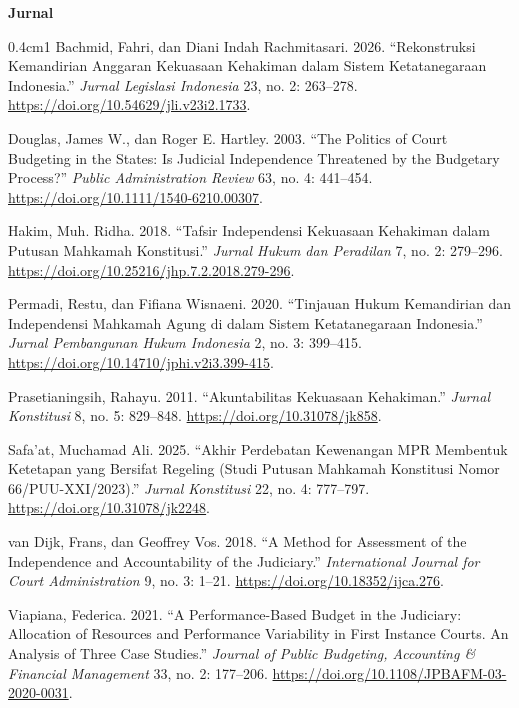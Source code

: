 \documentclass[12pt,a4paper,twocolumn]{article}
\begin{document}
\vspace{0.15em}
\noindent \textbf{Jurnal}
\begin{hangparas}{0.4cm}{1}
    Bachmid, Fahri, dan Diani Indah Rachmitasari. 2026. ``Rekonstruksi Kemandirian Anggaran Kekuasaan Kehakiman dalam Sistem Ketatanegaraan Indonesia.'' \textit{Jurnal Legislasi Indonesia} 23, no. 2: 263--278. \url{https://doi.org/10.54629/jli.v23i2.1733}.

    Douglas, James W., dan Roger E. Hartley. 2003. ``The Politics of Court Budgeting in the States: Is Judicial Independence Threatened by the Budgetary Process?'' \textit{Public Administration Review} 63, no. 4: 441--454. \url{https://doi.org/10.1111/1540-6210.00307}.

    Hakim, Muh. Ridha. 2018. ``Tafsir Independensi Kekuasaan Kehakiman dalam Putusan Mahkamah Konstitusi.'' \textit{Jurnal Hukum dan Peradilan} 7, no. 2: 279--296. \url{https://doi.org/10.25216/jhp.7.2.2018.279-296}.

    Permadi, Restu, dan Fifiana Wisnaeni. 2020. ``Tinjauan Hukum Kemandirian dan Independensi Mahkamah Agung di dalam Sistem Ketatanegaraan Indonesia.'' \textit{Jurnal Pembangunan Hukum Indonesia} 2, no. 3: 399--415. \url{https://doi.org/10.14710/jphi.v2i3.399-415}.

    Prasetianingsih, Rahayu. 2011. ``Akuntabilitas Kekuasaan Kehakiman.'' \textit{Jurnal Konstitusi} 8, no. 5: 829--848. \url{https://doi.org/10.31078/jk858}.

    Safa'at, Muchamad Ali. 2025. ``Akhir Perdebatan Kewenangan MPR Membentuk Ketetapan yang Bersifat Regeling (Studi Putusan Mahkamah Konstitusi Nomor 66/PUU-XXI/2023).'' \textit{Jurnal Konstitusi} 22, no. 4: 777--797. \url{https://doi.org/10.31078/jk2248}.

    van Dijk, Frans, dan Geoffrey Vos. 2018. ``A Method for Assessment of the Independence and Accountability of the Judiciary.'' \textit{International Journal for Court Administration} 9, no. 3: 1--21. \url{https://doi.org/10.18352/ijca.276}.

    Viapiana, Federica. 2021. ``A Performance-Based Budget in the Judiciary: Allocation of Resources and Performance Variability in First Instance Courts. An Analysis of Three Case Studies.'' \textit{Journal of Public Budgeting, Accounting \& Financial Management} 33, no. 2: 177--206. \url{https://doi.org/10.1108/JPBAFM-03-2020-0031}.
\end{hangparas}
\end{document}
